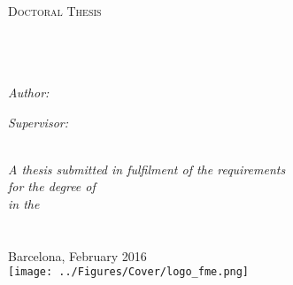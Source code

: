 \documentclass[
11pt, %
english, %
onehalfspacing %
]{MastersDoctoralThesis} %
\author{Alba \textsc{Hierro Fabregat}} %
\begin{document}
\frontmatter %

\pagestyle{plain} %


\begin{titlepage}
\begin{center}

\textsc{\LARGE \univname}\\[1.5cm] %
\textsc{\Large Doctoral Thesis}\\[0.5cm] %

\HRule \\[0.4cm] %
{\huge \bfseries \ttitle}\\[0.4cm] %
\HRule \\[1.5cm] %
 
\begin{minipage}{0.4\textwidth}
\begin{flushleft} \large
\emph{Author:}\\
{\authorname} %
\end{flushleft}
\end{minipage}
\begin{minipage}{0.4\textwidth}
\begin{flushright} \large
\emph{Supervisor:} \\
{\supname} %
\end{flushright}
\end{minipage}\\[3cm]
 
\large \textit{A thesis submitted in fulfilment of the requirements\\ for the degree of \degreename}\\[0.3cm] %
\textit{in the}\\[0.4cm]
\progname\\[0.5cm]
\deptname\\[2cm] %
 
{\large Barcelona, February 2016}\\[2cm] %
\texttt{[image: ../Figures/Cover/logo\_fme.png]}
 
\vfill
\end{center}
\end{titlepage}
\end{document}
